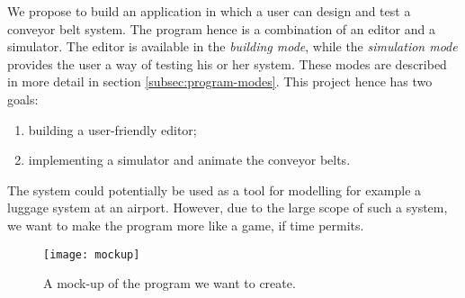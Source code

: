 We propose to build an application in which a user can design and test a conveyor belt system. The program hence is a combination of an editor and a simulator. The editor is available in the \textit{building mode}, while the \textit{simulation mode} provides the user a way of testing his or her system. These modes are described in more detail in section \ref{subsec:program-modes}. This project hence has two goals:
\begin{enumerate}
  \item building a user-friendly editor;
  \item implementing a simulator and animate the conveyor belts.
\end{enumerate}
The system could potentially be used as a tool for modelling for example a luggage system at an airport. However, due to the large scope of such a system, we want to make the program more like a game, if time permits.

\begin{figure}
  \begin{center}
    \texttt{[image: mockup]}
    \caption{A mock-up of the program we want to create.}
    \label{fig:mockup}
  \end{center}
\end{figure}
